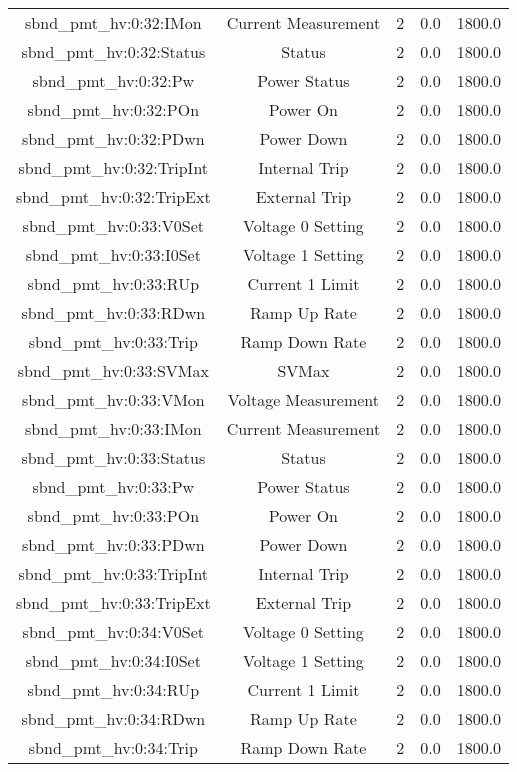 \begin{table}[ptb]
\begin{tabular}{c | c c c c}
sbnd_pmt_hv:0:32:IMon & Current Measurement & 2 & 0.0 & 1800.0\\ 
sbnd_pmt_hv:0:32:Status & Status & 2 & 0.0 & 1800.0\\ 
sbnd_pmt_hv:0:32:Pw & Power Status & 2 & 0.0 & 1800.0\\ 
sbnd_pmt_hv:0:32:POn & Power On & 2 & 0.0 & 1800.0\\ 
sbnd_pmt_hv:0:32:PDwn & Power Down & 2 & 0.0 & 1800.0\\ 
sbnd_pmt_hv:0:32:TripInt & Internal Trip & 2 & 0.0 & 1800.0\\ 
sbnd_pmt_hv:0:32:TripExt & External Trip & 2 & 0.0 & 1800.0\\ 
sbnd_pmt_hv:0:33:V0Set & Voltage 0 Setting & 2 & 0.0 & 1800.0\\ 
sbnd_pmt_hv:0:33:I0Set & Voltage 1 Setting & 2 & 0.0 & 1800.0\\ 
sbnd_pmt_hv:0:33:RUp & Current 1 Limit & 2 & 0.0 & 1800.0\\ 
sbnd_pmt_hv:0:33:RDwn & Ramp Up Rate & 2 & 0.0 & 1800.0\\ 
sbnd_pmt_hv:0:33:Trip & Ramp Down Rate & 2 & 0.0 & 1800.0\\ 
sbnd_pmt_hv:0:33:SVMax & SVMax & 2 & 0.0 & 1800.0\\ 
sbnd_pmt_hv:0:33:VMon & Voltage Measurement & 2 & 0.0 & 1800.0\\ 
sbnd_pmt_hv:0:33:IMon & Current Measurement & 2 & 0.0 & 1800.0\\ 
sbnd_pmt_hv:0:33:Status & Status & 2 & 0.0 & 1800.0\\ 
sbnd_pmt_hv:0:33:Pw & Power Status & 2 & 0.0 & 1800.0\\ 
sbnd_pmt_hv:0:33:POn & Power On & 2 & 0.0 & 1800.0\\ 
sbnd_pmt_hv:0:33:PDwn & Power Down & 2 & 0.0 & 1800.0\\ 
sbnd_pmt_hv:0:33:TripInt & Internal Trip & 2 & 0.0 & 1800.0\\ 
sbnd_pmt_hv:0:33:TripExt & External Trip & 2 & 0.0 & 1800.0\\ 
sbnd_pmt_hv:0:34:V0Set & Voltage 0 Setting & 2 & 0.0 & 1800.0\\ 
sbnd_pmt_hv:0:34:I0Set & Voltage 1 Setting & 2 & 0.0 & 1800.0\\ 
sbnd_pmt_hv:0:34:RUp & Current 1 Limit & 2 & 0.0 & 1800.0\\ 
sbnd_pmt_hv:0:34:RDwn & Ramp Up Rate & 2 & 0.0 & 1800.0\\ 
sbnd_pmt_hv:0:34:Trip & Ramp Down Rate & 2 & 0.0 & 1800.0\\ 

\end{tabular}
\end{table}
